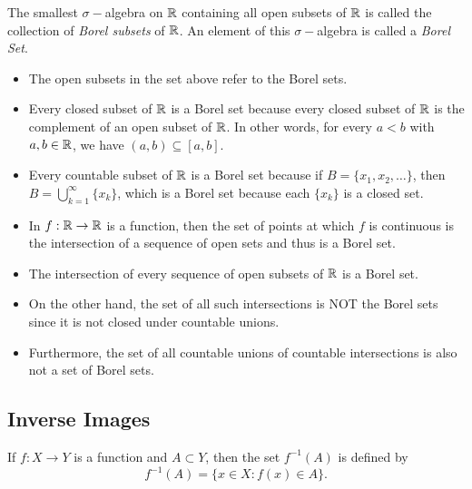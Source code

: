 \documentclass[11pt,a4paper]{book}
\begin{document}
\begin{definition}
    The smallest \( \sigma- \)algebra on \( \mathbb{R}  \) containing all open subsets of \( \mathbb{R}  \) is called the collection of \textit{Borel subsets} of \( \mathbb{R}  \). An element of this \( \sigma- \)algebra is called a \textit{Borel Set}. 
\end{definition}

\begin{itemize}
    \item The open subsets in the set above refer to the Borel sets. 
\end{itemize}

\begin{eg}
   \begin{itemize}
       \item Every closed subset of \( \mathbb{R}  \) is a Borel set because every closed subset of \( \mathbb{R}  \) is the complement of an open subset of \(  \mathbb{R}  \). In other words, for every \( a < b  \) with \( a,b \in \mathbb{R}  \), we have \( (a,b) \subseteq [a,b] \).
        \item Every countable subset of \( \mathbb{R}  \) is a Borel set because if \( B = \{ {x}_{1}, {x}_{2}, \dots  \}  \), then \( B = \bigcup_{ k = 1  }^{ \infty  } \{ {x}_{k } \}  \), which is a Borel set because each \( \{ {x}_{k } \}  \) is a closed set.
        \item In \( f: \mathbb{R} \to \mathbb{R}  \) is a function, then the set of points at which \( f  \) is continuous is the intersection of a sequence of open sets and thus is a Borel set.
   \end{itemize} 
\end{eg}

\begin{itemize}
    \item The intersection of every sequence of open subsets of \( \mathbb{R}  \) is a Borel set.       \item On the other hand, the set of all such intersections is NOT the Borel sets since it is not closed under countable unions.  
    \item Furthermore, the set of all countable unions of countable intersections is also not a set of Borel sets.
\end{itemize}

\subsection{Inverse Images}

\begin{definition}
    If \( f: X  \to Y  \) is a function and \( A \subset Y  \), then the set \( f^{-1}(A) \) is defined by
    \[  f^{-1}(A) = \{ x \in X : f(x) \in A  \}. \]
\end{definition}
\end{document}
